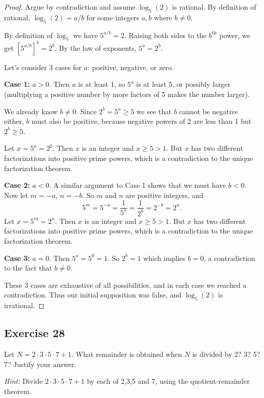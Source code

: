\documentclass[14pt]{extarticle}
\begin{document}
\begin{proof}
Argue by contradiction and assume $\log_5(2)$ is rational. By definition of rational, $\log_5(2) = a/b$ for some integers $a, b$ where $b \neq 0$. 

By definition of $\log_5$ we have $5^{a/b} = 2$. Raising both sides to the $b^{\text{th}}$ power, we get $[5^{a/b}]^b = 2^b$. By the law of exponents, $5^a = 2^b$. 

Let's consider 3 cases for $a$: positive, negative, or zero.

{\bf Case 1:} $a > 0$. Then $a$ is at least 1, so $5^a$ is at least 5, or possibly larger (multiplying a positive number by more factors of 5 makes the number larger).

We already know $b \neq 0$. Since $2^b = 5^a \geq 5$ we see that $b$ cannot be negative either, $b$ must also be positive, because negative powers of 2 are less than 1 but $2^b \geq 5$.

Let $x = 5^a = 2^b$. Then $x$ is an integer and $x \geq 5 > 1$. But $x$ has two different factorizations into positive prime powers, which is a contradiction to the unique factorization theorem.

{\bf Case 2:} $a < 0$. A similar argument to Case 1 shows that we must have $b < 0$. Now let $m = -a$, $n = -b$. So $m$ and $n$ are positive integers, and 
\[
5^m = 5^{-a} = \frac{1}{5^a} = \frac{1}{2^b} = 2^{-b} = 2^n.
\]
Let $x = 5^m = 2^n$. Then $x$ is an integer and $x \geq 5 > 1$. But $x$ has two different factorizations into positive prime powers, which is a contradiction to the unique factorization theorem.

{\bf Case 3:} $a = 0$. Then $5^a = 5^0 = 1$. So $2^b = 1$ which implies $b = 0$, a contradiction to the fact that $b \neq 0$.

These 3 cases are exhaustive of all possibilities, and in each case we reached a contradiction. Thus our initial supposition was false, and $\log_5(2)$ is irrational.
\end{proof}

\subsection{Exercise 28}
Let $N = 2\cdot3\cdot5\cdot7 + 1$. What remainder is obtained when $N$ is divided by 2? 3? 5? 7? Justify your answer.

{\it Hint:} Divide $2\cdot3\cdot5\cdot7 + 1$ by each of 2,3,5 and 7, using the quotient-remainder theorem.
\end{document}
